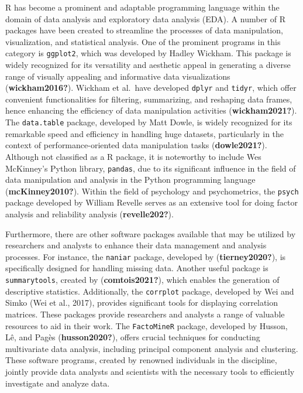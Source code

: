 \documentclass[print]{nuthesis}
\begin{document}
R has become a prominent and adaptable programming language within the domain of data analysis and exploratory data analysis (EDA).
A number of R packages have been created to streamline the processes of data manipulation, visualization, and statistical analysis.
One of the prominent programs in this category is \texttt{ggplot2}, which was developed by Hadley Wickham.
This package is widely recognized for its versatility and aesthetic appeal in generating a diverse range of visually appealing and informative data visualizations (\textbf{wickham2016?}).
Wickham et al.~have developed \texttt{dplyr} and \texttt{tidyr}, which offer convenient functionalities for filtering, summarizing, and reshaping data frames, hence enhancing the efficiency of data manipulation activities (\textbf{wickham2021?}).
The \texttt{data.table} package, developed by Matt Dowle, is widely recognized for its remarkable speed and efficiency in handling huge datasets, particularly in the context of performance-oriented data manipulation tasks (\textbf{dowle2021?}).
Although not classified as a R package, it is noteworthy to include Wes McKinney's Python library, \texttt{pandas}, due to its significant influence in the field of data manipulation and analysis in the Python programming language (\textbf{mcKinney2010?}).
Within the field of psychology and psychometrics, the \texttt{psych} package developed by William Revelle serves as an extensive tool for doing factor analysis and reliability analysis (\textbf{revelle202?}).

Furthermore, there are other software packages available that may be utilized by researchers and analysts to enhance their data management and analysis processes.
For instance, the \texttt{naniar} package, developed by (\textbf{tierney2020?}), is specifically designed for handling missing data. Another useful package is \texttt{summarytools}, created by (\textbf{comtois2021?}), which enables the generation of descriptive statistics.
Additionally, the \texttt{corrplot} package, developed by Wei and Simko (Wei et al., 2017), provides significant tools for displaying correlation matrices.
These packages provide researchers and analysts a range of valuable resources to aid in their work.
The \texttt{FactoMineR} package, developed by Husson, Lê, and Pagès (\textbf{husson2020?}), offers crucial techniques for conducting multivariate data analysis, including principal component analysis and clustering.
These software programs, created by renowned individuals in the discipline, jointly provide data analysts and scientists with the necessary tools to efficiently investigate and analyze data.
\end{document}
